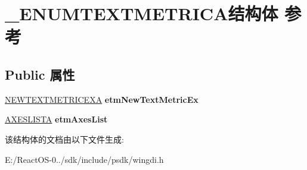 \hypertarget{struct___e_n_u_m_t_e_x_t_m_e_t_r_i_c_a}{}\section{\+\_\+\+E\+N\+U\+M\+T\+E\+X\+T\+M\+E\+T\+R\+I\+C\+A结构体 参考}
\label{struct___e_n_u_m_t_e_x_t_m_e_t_r_i_c_a}
\subsection*{Public 属性}
\begin{DoxyCompactItemize}
\item 
\mbox{\label{struct___e_n_u_m_t_e_x_t_m_e_t_r_i_c_a_abbd0d2cfd715e2e92c467b868932ca84}} 
\hyperlink{structtag_n_e_w_t_e_x_t_m_e_t_r_i_c_e_x_a}{N\+E\+W\+T\+E\+X\+T\+M\+E\+T\+R\+I\+C\+E\+XA} {\bfseries etm\+New\+Text\+Metric\+Ex}
\item 
\mbox{\label{struct___e_n_u_m_t_e_x_t_m_e_t_r_i_c_a_a8e02dc2c151b5bf38c65454e560758a5}} 
\hyperlink{struct___a_x_e_s_l_i_s_t_a}{A\+X\+E\+S\+L\+I\+S\+TA} {\bfseries etm\+Axes\+List}
\end{DoxyCompactItemize}


该结构体的文档由以下文件生成\+:\begin{DoxyCompactItemize}
\item 
E\+:/\+React\+O\+S-\/0../sdk/include/psdk/wingdi.\+h\end{DoxyCompactItemize}
